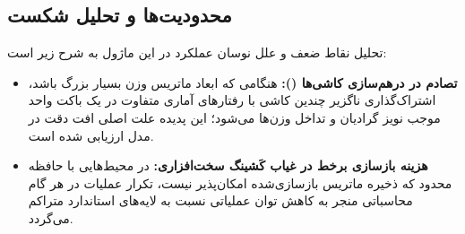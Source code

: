 \subsection{محدودیت‌ها و تحلیل شکست}
تحلیل نقاط ضعف و علل نوسان عملکرد در این ماژول به شرح زیر است:
\begin{itemize}
    \item \textbf{تصادم در درهم‌سازی کاشی‌ها ():} هنگامی که ابعاد ماتریس وزن بسیار بزرگ باشد، اشتراک‌گذاری ناگزیر چندین کاشی با رفتارهای آماری متفاوت در یک باکت واحد موجب نویز گرادیان و تداخل وزن‌ها می‌شود؛ این پدیده علت اصلی افت دقت در مدل  ارزیابی شده است.
    \item \textbf{هزینه بازسازی برخط در غیاب کَشینگ سخت‌افزاری:} در محیط‌هایی با حافظه محدود که ذخیره ماتریس بازسازی‌شده امکان‌پذیر نیست، تکرار عملیات  در هر گام محاسباتی منجر به کاهش توان عملیاتی نسبت به لایه‌های استاندارد متراکم می‌گردد.
\end{itemize}
